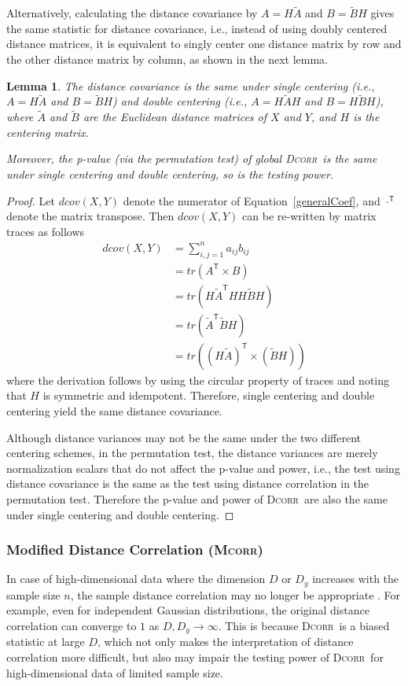 \documentclass[11pt]{article}
\providecommand{\sct}[1]{{\normalfont\textsc{#1}}}
\newcommand{\T}{^{\ensuremath{\mathsf{T}}}}           %
\newcommand{\Dcorr}{\sct{Dcorr}}
\newcommand{\Mcorr}{\sct{Mcorr}}
\newtheorem{lem}{Lemma}
\begin{document}
Alternatively, calculating the distance covariance by $A=H\tilde{A}$ and $B=\tilde{B}H$ gives the same statistic for distance covariance, i.e., instead of using doubly centered distance matrices, it is equivalent to singly center one distance matrix by row and the other distance matrix by column, as shown in the next lemma.

\begin{lem}
\label{lem1}
The distance covariance is the same under single centering (i.e., $A=H\tilde{A}$ and $B=\tilde{B}H$) and double centering (i.e., $A=H\tilde{A}H$ and $B=H\tilde{B}H$), where $\tilde{A}$ and $\tilde{B}$ are the Euclidean distance matrices of $X$ and $Y$, and $H$ is the centering matrix. 

Moreover, the p-value (via the permutation test) of global \Dcorr~is the same under single centering and double centering, so is the testing power.
\end{lem}
\begin{proof}
Let $dcov(X,Y)$ denote the numerator of Equation~\ref{generalCoef}, and $\cdot\T$ denote the matrix transpose. Then $dcov(X,Y)$ can be re-written by matrix traces as follows
\begin{align*}
dcov(X,Y) &= \sum_{i,j=1}^{n}a_{ij}b_{ij} \\
 &= tr(A\T \times B) \\
 &= tr(H\tilde{A}\T HH\tilde{B}H) \\
 &= tr(\tilde{A}\T \tilde{B}H) \\
 &= tr((H\tilde{A})\T \times (\tilde{B}H))
\end{align*}
where the derivation follows by using the circular property of traces and noting that $H$ is symmetric and idempotent. Therefore, single centering and double centering yield the same distance covariance.

Although distance variances may not be the same under the two different centering schemes, in the permutation test, the distance variances are merely normalization scalars that do not affect the p-value and power, i.e., the test using distance covariance is the same as the test using distance correlation in the permutation test. Therefore the p-value and power of \Dcorr~are also the same under single centering and double centering.
\end{proof}

\subsubsection{Modified Distance Correlation (\Mcorr)}
\label{appen:mcorr}
In case of high-dimensional data where the dimension $D$ or $D_y$ increases with the sample size $n$, the sample distance correlation may no longer be appropriate \cite{SzekelyRizzo2013a}. For example, even for independent Gaussian distributions, the original distance correlation can converge to $1$ as $D, D_y \rightarrow \infty$. This is because \Dcorr~is a biased statistic at large $D$, which not only makes the interpretation of distance correlation more difficult, but also may impair the testing power of \Dcorr~for high-dimensional data of limited sample size.
\end{document}
